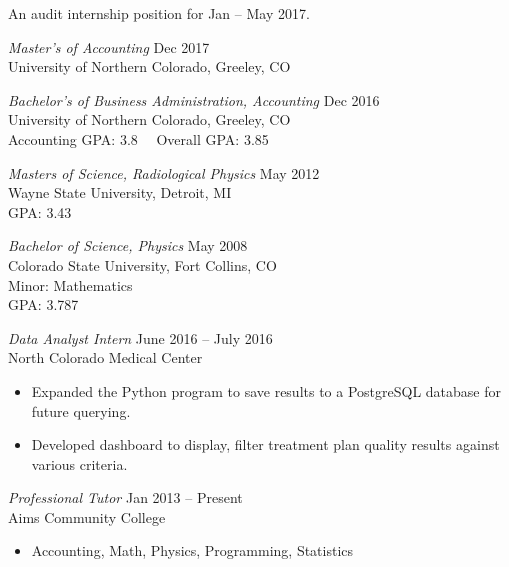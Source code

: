 \documentclass[11pt]{article}
\begin{document}
\begin{description}[leftmargin=!,labelwidth=2cm,align=right]
\item[Objective]
    An audit internship position for Jan -- May 2017.

\item[Education]
    {\sl Master's of Accounting} \hfill Dec 2017\\
    University of Northern Colorado, Greeley, CO

    {\sl Bachelor's of Business Administration, Accounting} \hfill Dec 2016\\
    University of Northern Colorado, Greeley, CO\\
    Accounting GPA: 3.8 \qquad\ \  Overall GPA: 3.85

    {\sl Masters of Science, Radiological Physics} \hfill May 2012\\
    Wayne State University, Detroit, MI\\
    GPA: 3.43

    {\sl Bachelor of Science, Physics} \hfill May 2008\\
    Colorado State University, Fort Collins, CO \\
    Minor: Mathematics\\
    GPA: 3.787

\item[Experience]
    {\sl Data Analyst Intern} \hfill June 2016 -- July 2016\\North Colorado Medical Center
    \begin{itemize}[rightmargin=2cm,noitemsep]
        \item Expanded the Python program to save results to a PostgreSQL database for future querying.
        \item Developed dashboard to display, filter treatment plan quality results against various criteria.
    \end{itemize}

    {\sl Professional Tutor} \hfill Jan 2013 -- Present\\Aims Community College
    \begin{itemize}[rightmargin=2cm,noitemsep]
        \item Accounting, Math, Physics, Programming, Statistics
    \end{itemize}


\end{description}
\end{document}

